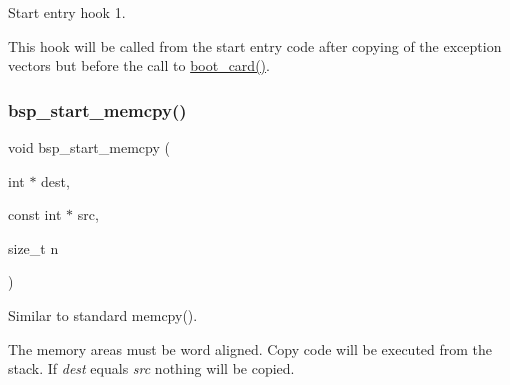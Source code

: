 Start entry hook 1. 

This hook will be called from the start entry code after copying of the exception vectors but before the call to \mbox{\hyperlink{group__RTEMSBSPsSharedStartup_gad8a18766fa4f3cf67d8f8ff8938008e0}{boot\+\_\+card()}}. \mbox{\label{group__arm__start_gaf2f9f23af6ccab93a4f88ce1157107d1}} 
\subsubsection{\texorpdfstring{bsp\_start\_memcpy()}{bsp\_start\_memcpy()}}
{\footnotesize\ttfamily void bsp\+\_\+start\+\_\+memcpy (\begin{DoxyParamCaption}\item[{int $\ast$}]{dest,  }\item[{const int $\ast$}]{src,  }\item[{size\+\_\+t}]{n }\end{DoxyParamCaption})}



Similar to standard memcpy(). 

The memory areas must be word aligned. Copy code will be executed from the stack. If {\itshape dest} equals {\itshape src} nothing will be copied. 